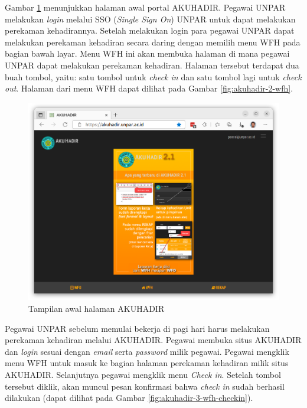 Gambar \ref{fig:akuhadir-1-beranda} menunjukkan halaman awal portal AKUHADIR. Pegawai UNPAR melakukan \textit{login} melalui SSO (\textit{Single Sign On}) UNPAR untuk dapat melakukan perekaman kehadirannya. Setelah melakukan login para pegawai UNPAR dapat melakukan perekaman kehadiran secara daring dengan memilih menu WFH pada bagian bawah layar. Menu WFH ini akan membuka halaman di mana pegawai UNPAR dapat melakukan perekaman kehadiran. Halaman tersebut terdapat dua buah tombol, yaitu: satu tombol untuk \textit{check in} dan satu tombol lagi untuk \textit{check out}. Halaman dari menu WFH dapat dilihat pada Gambar \ref{fig:akuhadir-2-wfh}.
\begin{figure}[H]
	\centering
	\includegraphics[scale=0.3]{Gambar/akuhadir-1-beranda.png}
	\caption{Tampilan awal halaman AKUHADIR} 
	\label{fig:akuhadir-1-beranda}
\end{figure}

Pegawai UNPAR sebelum memulai bekerja di pagi hari harus melakukan perekaman kehadiran melalui AKUHADIR. Pegawai membuka situs AKUHADIR dan \textit{login} sesuai dengan \textit{email} serta \textit{password} milik pegawai. Pegawai mengklik menu WFH untuk masuk ke bagian halaman perekaman kehadiran milik situs AKUHADIR. Selanjutnya pegawai mengklik menu \textit{Check in}. Setelah tombol tersebut diklik, akan muncul pesan konfirmasi bahwa \textit{check in} sudah berhasil dilakukan (dapat dilihat pada Gambar \ref{fig:akuhadir-3-wfh-checkin}).

